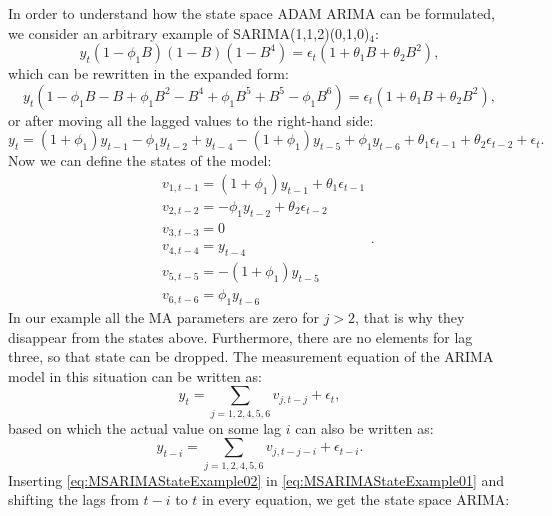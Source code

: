 \documentclass[
]{book}
\theoremstyle{definition}
\theoremstyle{definition}
\theoremstyle{definition}
\theoremstyle{definition}
\theoremstyle{remark}
\begin{document}
In order to understand how the state space ADAM ARIMA can be formulated, we consider an arbitrary example of SARIMA(1,1,2)(0,1,0)\(_4\):
\begin{equation*}
    {y}_{t} (1- \phi_1 B)(1-B)(1-B^4) = \epsilon_t (1 + \theta_1 B + \theta_2 B^2),
\end{equation*}
which can be rewritten in the expanded form:
\begin{equation*}
    {y}_{t} (1-\phi_1 B -B + \phi_1 B^2 -B^4 +\phi_1 B^5 + B^5 -\phi_1 B^6) = \epsilon_t (1 + \theta_1 B + \theta_2 B^2),
\end{equation*}
or after moving all the lagged values to the right-hand side:
\begin{equation*}
    {y}_{t} = (1+\phi_1) {y}_{t-1} -\phi_1 {y}_{t-2} + {y}_{t-4} -(1+\phi_1) {y}_{t-5} + \phi_1 {y}_{t-6} + \theta_1 \epsilon_{t-1} + \theta_2 \epsilon_{t-2} + \epsilon_t .
\end{equation*}
Now we can define the states of the model:
\begin{equation}
    \begin{aligned}
    & v_{1,t-1} = (1+\phi_1) y_{t-1} + \theta_1 \epsilon_{t-1} \\
    & v_{2,t-2} = -\phi_1 y_{t-2} + \theta_2 \epsilon_{t-2} \\
    & v_{3,t-3} = 0 \\
    & v_{4,t-4} = y_{t-4} \\
    & v_{5,t-5} = -(1+\phi_1) y_{t-5} \\
    & v_{6,t-6} = \phi_1 y_{t-6}
    \end{aligned} .
  \label{eq:MSARIMAStateExample01}
\end{equation}
In our example all the MA parameters are zero for \(j>2\), that is why they disappear from the states above. Furthermore, there are no elements for lag three, so that state can be dropped. The measurement equation of the ARIMA model in this situation can be written as:
\begin{equation*}
    {y}_{t} = \sum_{j=1,2,4,5,6} v_{j,t-j} + \epsilon_t ,
\end{equation*}
based on which the actual value on some lag \(i\) can also be written as:
\begin{equation}
    {y}_{t-i} = \sum_{j=1,2,4,5,6} v_{j,t-j-i} + \epsilon_{t-i}.
  \label{eq:MSARIMAStateExample02}
\end{equation}
Inserting \eqref{eq:MSARIMAStateExample02} in \eqref{eq:MSARIMAStateExample01} and shifting the lags from \(t-i\) to \(t\) in every equation, we get the state space ARIMA:
\end{document}
